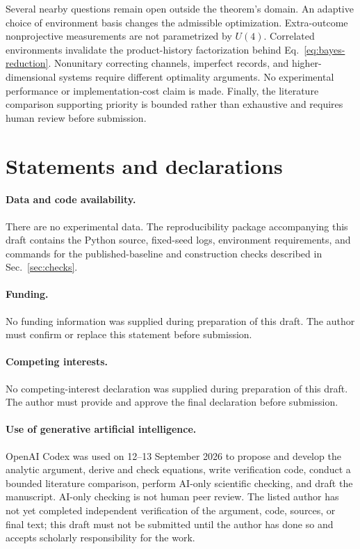 \documentclass[11pt]{article}
\theoremstyle{remark}
\begin{document}
Several nearby questions remain open outside the theorem's domain.  An
adaptive choice of environment basis changes the admissible optimization.
Extra-outcome nonprojective measurements are not parametrized by $U(4)$.
Correlated environments invalidate the product-history factorization behind
Eq.~\eqref{eq:bayes-reduction}.  Nonunitary correcting channels, imperfect
records, and higher-dimensional systems require different optimality
arguments.  No experimental performance or implementation-cost claim is made.
Finally, the literature comparison supporting priority is bounded rather than
exhaustive and requires human review before submission.

\section*{Statements and declarations}

\paragraph{Data and code availability.}
There are no experimental data.  The reproducibility package accompanying
this draft contains the Python source, fixed-seed logs, environment
requirements, and commands for the published-baseline and construction
checks described in Sec.~\ref{sec:checks}.

\paragraph{Funding.}
No funding information was supplied during preparation of this draft.  The
author must confirm or replace this statement before submission.

\paragraph{Competing interests.}
No competing-interest declaration was supplied during preparation of this
draft.  The author must provide and approve the final declaration before
submission.

\paragraph{Use of generative artificial intelligence.}
OpenAI Codex was used on 12--13 September 2026 to propose and develop the
analytic argument, derive and check equations, write verification code,
conduct a bounded literature comparison, perform AI-only scientific checking,
and draft the manuscript.  AI-only checking is not human peer review.  The
listed author has not yet completed independent verification of the argument,
code, sources, or final text; this draft must not be submitted until the author
has done so and accepts scholarly responsibility for the work.



\end{document}
